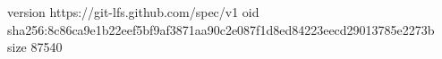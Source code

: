 version https://git-lfs.github.com/spec/v1
oid sha256:8c86ca9e1b22eef5bf9af3871aa90c2e087f1d8ed84223eecd29013785e2273b
size 87540
